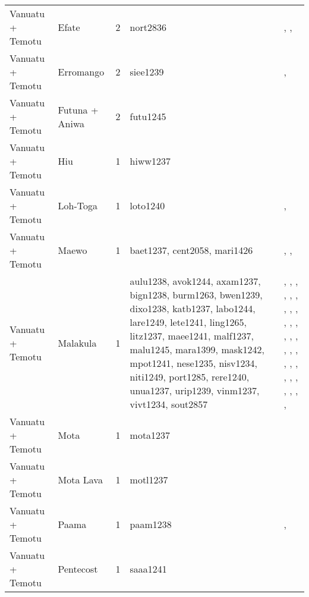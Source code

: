 \begin{longtable}{p{4.5cm}p{2cm}p{2cm}p{2cm}p{4cm}}
  Vanuatu + Temotu & Efate & 2 & nort2836 & \citet{facey1981hereditary}, \citet{facey1981hereditary}, \citet{facey1981hereditary} \\ 
  Vanuatu + Temotu & Erromango & 2 & siee1239 & \citet{humphreys1926}, \citet{spriggs1989archaeological} \\ 
  Vanuatu + Temotu & Futuna + Aniwa & 2 & futu1245 & \citet{capell1958culture} \\ 
  Vanuatu + Temotu & Hiu & 1 & hiww1237 & \citet{bonnemaison1996power} \\ 
  Vanuatu + Temotu & Loh-Toga & 1 & loto1240 & \citet{bonnemaison1996power}, \citet{bonnemaison1996power} \\ 
  Vanuatu + Temotu & Maewo & 1 & baet1237, cent2058, mari1426 & \citet{bonnemaison1996power}, \citet{bonnemaison1996power}, \citet{bonnemaison1996power} \\ 
  Vanuatu + Temotu & Malakula & 1 & aulu1238, avok1244, axam1237, bign1238, burm1263, bwen1239, dixo1238, katb1237, labo1244, lare1249, lete1241, ling1265, litz1237, maee1241, malf1237, malu1245, mara1399, mask1242, mpot1241, nese1235, nisv1234, niti1249, port1285, rere1240, unua1237, urip1239, vinm1237, vivt1234, sout2857 & \citet{bonnemaison1996power}, \citet{bonnemaison1996power}, \citet{bonnemaison1996power}, \citet{bonnemaison1996power}, \citet{bonnemaison1996power}, \citet{bonnemaison1996power}, \citet{bonnemaison1996power}, \citet{bonnemaison1996power}, \citet{bonnemaison1996power}, \citet{bonnemaison1996power}, \citet{bonnemaison1996power}, \citet{bonnemaison1996power}, \citet{bonnemaison1996power}, \citet{bonnemaison1996power}, \citet{bonnemaison1996power}, \citet{bonnemaison1996power}, \citet{bonnemaison1996power}, \citet{bonnemaison1996power}, \citet{bonnemaison1996power}, \citet{bonnemaison1996power}, \citet{bonnemaison1996power}, \citet{bonnemaison1996power}, \citet{bonnemaison1996power}, \citet{bonnemaison1996power}, \citet{bonnemaison1996power}, \citet{bonnemaison1996power}, \citet{bonnemaison1996power}, \citet{bonnemaison1996power}, \citet{deacon1934} \\ 
  Vanuatu + Temotu & Mota & 1 & mota1237 & \citet{bonnemaison1996power} \\ 
  Vanuatu + Temotu & Mota Lava & 1 & motl1237 & \citet{bonnemaison1996power} \\ 
  Vanuatu + Temotu & Paama & 1 & paam1238 & \citet{bonnemaison1996power}, \citet{bonnemaison1996power} \\ 
  Vanuatu + Temotu & Pentecost & 1 & saaa1241 & \citet{lane1956} \\ 

\end{longtable}
